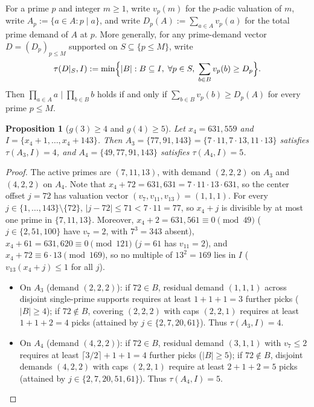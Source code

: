 \documentclass[11pt]{article}
\newtheorem{proposition}[theorem]{Proposition}
\begin{document}
For a prime $p$ and integer $m \ge 1$, write $v_p(m)$ for the $p$-adic valuation of $m$, write $A_p := \{a \in A : p \mid a\}$, and write $D_p(A) := \sum_{a \in A} v_p(a)$ for the total prime demand of $A$ at $p$. More generally, for any prime-demand vector $D = (D_p)_{p \le M}$ supported on $S \subseteq \{p \le M\}$, write
\[
\tau(D|_S, I) := \min\Bigl\{ |B| : B \subseteq I, \; \forall p \in S, \; \sum_{b \in B} v_p(b) \ge D_p \Bigr\}.
\]
Then $\prod_{a \in A} a \mid \prod_{b \in B} b$ holds if and only if $\sum_{b \in B} v_p(b) \ge D_p(A)$ for every prime $p \le M$.

\begin{proposition}[$g(3) \ge 4$ and $g(4) \ge 5$]
\label{prop:g34}
Let $x_4 = 631{,}559$ and $I = \{x_4 + 1, \dots, x_4 + 143\}$. Then $A_3 = \{77, 91, 143\} = \{7 \cdot 11, 7 \cdot 13, 11 \cdot 13\}$ satisfies $\tau(A_3, I) = 4$, and $A_4 = \{49, 77, 91, 143\}$ satisfies $\tau(A_4, I) = 5$.
\end{proposition}
\begin{proof}
The active primes are $(7, 11, 13)$, with demand $(2, 2, 2)$ on $A_3$ and $(4, 2, 2)$ on $A_4$. Note that $x_4 + 72 = 631{,}631 = 7 \cdot 11 \cdot 13 \cdot 631$, so the center offset $j = 72$ has valuation vector $(v_7, v_{11}, v_{13}) = (1, 1, 1)$. For every $j \in \{1, \dots, 143\} \setminus \{72\}$, $|j - 72| \le 71 < 7 \cdot 11 = 77$, so $x_4 + j$ is divisible by at most one prime in $\{7, 11, 13\}$. Moreover, $x_4 + 2 = 631{,}561 \equiv 0 \pmod{49}$ ($j \in \{2, 51, 100\}$ have $v_7 = 2$, with $7^3 = 343$ absent), $x_4 + 61 = 631{,}620 \equiv 0 \pmod{121}$ ($j = 61$ has $v_{11} = 2$), and $x_4 + 72 \equiv 6 \cdot 13 \pmod{169}$, so no multiple of $13^2 = 169$ lies in $I$ ($v_{13}(x_4 + j) \le 1$ for all $j$).
\begin{itemize}
\item On $A_3$ (demand $(2, 2, 2)$): if $72 \in B$, residual demand $(1, 1, 1)$ across disjoint single-prime supports requires at least $1 + 1 + 1 = 3$ further picks ($|B| \ge 4$); if $72 \notin B$, covering $(2, 2, 2)$ with caps $(2, 2, 1)$ requires at least $1 + 1 + 2 = 4$ picks (attained by $j \in \{2, 7, 20, 61\}$). Thus $\tau(A_3, I) = 4$.
\item On $A_4$ (demand $(4, 2, 2)$): if $72 \in B$, residual demand $(3, 1, 1)$ with $v_7 \le 2$ requires at least $\lceil 3 / 2 \rceil + 1 + 1 = 4$ further picks ($|B| \ge 5$); if $72 \notin B$, disjoint demands $(4, 2, 2)$ with caps $(2, 2, 1)$ require at least $2 + 1 + 2 = 5$ picks (attained by $j \in \{2, 7, 20, 51, 61\}$). Thus $\tau(A_4, I) = 5$.
\end{itemize}
\end{proof}
\end{document}
